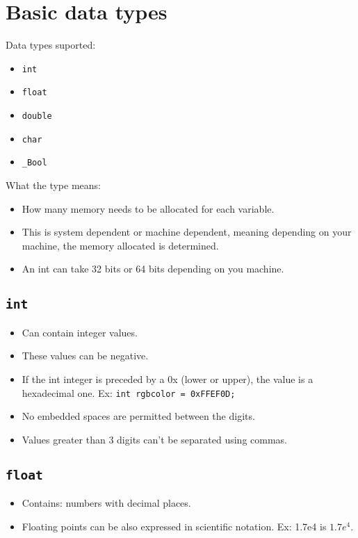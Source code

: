 \section{Basic data types}
Data types suported: 
\begin{itemize}
    \item \texttt{int}
    \item \texttt{float}
    \item \texttt{double}
    \item \texttt{char}
    \item \texttt{_Bool}
\end{itemize}
What the type means: 
\begin{itemize}
    \item How many memory needs to be allocated for each variable. 
    \item This is system dependent or machine dependent, meaning depending on your machine, the memory allocated is determined. 
    \item An int can take 32 bits or 64 bits depending on you machine. 
\end{itemize}

\subsection{\texttt{int}}
\begin{itemize}
    \item Can contain integer values.
    \item These values can be negative. 
    \item If the int integer is preceded by a 0x (lower or upper), the value is a hexadecimal one. Ex: \texttt{int rgbcolor = 0xFFEF0D;}
    \item No embedded spaces are permitted between the digits.
    \item Values greater than 3 digits can't be separated using commas. 
\end{itemize}
\subsection{\texttt{float}}
\begin{itemize}
    \item Contains: numbers with decimal places. 
    \item Floating points can be also expressed in scientific notation. Ex: 1.7e4 is $1.7e^4$.
\end{itemize}
